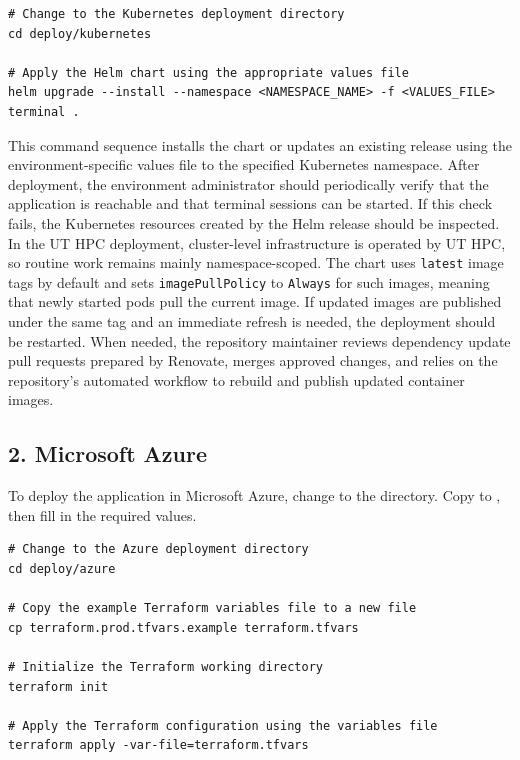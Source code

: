 \begin{verbatim}
# Change to the Kubernetes deployment directory
cd deploy/kubernetes

# Apply the Helm chart using the appropriate values file
helm upgrade --install --namespace <NAMESPACE_NAME> -f <VALUES_FILE> terminal .
\end{verbatim}

This command sequence installs the chart or updates an existing release using the environment-specific values file to the specified Kubernetes namespace.
After deployment, the environment administrator should periodically verify that the application is reachable and that terminal sessions can be started.
If this check fails, the Kubernetes resources created by the Helm release should be inspected.
In the UT HPC deployment, cluster-level infrastructure is operated by UT HPC, so routine work remains mainly namespace-scoped.
The chart uses \texttt{latest} image tags by default and sets \texttt{imagePullPolicy} to \texttt{Always} for such images, meaning that newly started pods pull the current image.
If updated images are published under the same tag and an immediate refresh is needed, the deployment should be restarted.
When needed, the repository maintainer reviews dependency update pull requests prepared by Renovate, merges approved changes, and relies on the repository's automated workflow to rebuild and publish updated container images.

\subsection*{2. Microsoft Azure}
To deploy the application in Microsoft Azure, change to the  directory.
Copy  to , then fill in the required values.

\begin{verbatim}
# Change to the Azure deployment directory
cd deploy/azure

# Copy the example Terraform variables file to a new file
cp terraform.prod.tfvars.example terraform.tfvars

# Initialize the Terraform working directory
terraform init

# Apply the Terraform configuration using the variables file
terraform apply -var-file=terraform.tfvars
\end{verbatim}

